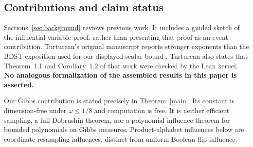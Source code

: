 \documentclass[11pt]{article}
\theoremstyle{definition}\newtheorem{definition}[theorem]{Definition}
\theoremstyle{remark}\newtheorem{remark}[theorem]{Remark}
\begin{document}
\begin{center}
\end{center}

\subsection*{Contributions and claim status}
Sections~\ref{sec:background} reviews previous work. It includes a guided sketch of the influential-variable proof, rather than presenting that proof as an event contribution. Turturean's original manuscript reports stronger exponents than the BDST exposition used for our displayed scalar bound \cite{Tur26,BDST26}. Turturean also states that Theorem~1.1 and Corollary~1.2 of that work were checked by the Lean kernel. \textbf{No analogous formalization of the assembled results in this paper is asserted.}

Our Gibbs contribution is stated precisely in Theorem~\ref{main}. Its constant is dimension-free under $\omega\leq1/8$ and computation is free. It is neither efficient sampling, a full-Dobrushin theorem, nor a polynomial-influence theorem for bounded polynomials on Gibbs measures. Product-alphabet influences below are coordinate-resampling influences, distinct from uniform Boolean flip influence.
\end{document}
